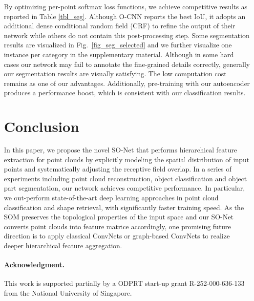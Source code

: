 \documentclass[10pt,twocolumn,letterpaper]{article}
\begin{document}
By optimizing per-point softmax loss functions, we achieve competitive results as reported in Table \ref{tbl_seg}. Although O-CNN reports the best IoU, it adopts an additional dense conditional random field (CRF) to refine the output of their network while others do not contain this post-processing step. Some segmentation results are visualized in Fig.~\ref{fig_seg_selected} and we further visualize one instance per category in the supplementary material. Although in some hard cases our network may fail to annotate the fine-grained details correctly, generally our segmentation results are visually satisfying. The low computation cost remains as one of our advantages. Additionally, pre-training with our autoencoder produces a performance boost, which is consistent with our classification results.



\section{Conclusion} \label{sec_conclusion}
In this paper, we propose the novel SO-Net that performs hierarchical feature extraction for point clouds by explicitly modeling the spatial distribution of input points and systematically adjusting the receptive field overlap. In a series of experiments including point cloud reconstruction, object classification and object part segmentation, our network achieves competitive performance. In particular, we out-perform state-of-the-art deep learning approaches in point cloud classification and shape retrieval, with significantly faster training speed. As the SOM preserves the topological properties of the input space and our SO-Net converts point clouds into feature matrice accordingly, one promising future direction is to apply classical ConvNets or graph-based ConvNets to realize deeper hierarchical feature aggregation.


\vspace{-8pt}
\paragraph{Acknowledgment.} \label{sec_ack}
This work is supported partially by a ODPRT start-up grant R-252-000-636-133 from the National University of Singapore.






{\small


}
\end{document}
